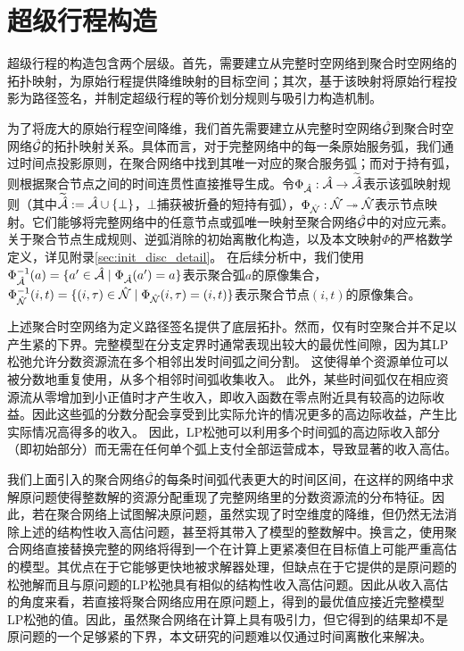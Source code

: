 \section{超级行程构造}
\label{sec:lbm}

超级行程的构造包含两个层级。首先，需要建立从完整时空网络到聚合时空网络的拓扑映射，为原始行程提供降维映射的目标空间；其次，基于该映射将原始行程投影为路径签名，并制定超级行程的等价划分规则与吸引力构造机制。


为了将庞大的原始行程空间降维，我们首先需要建立从完整时空网络$\full{\net}$到聚合时空网络$\hat{\mathcal{G}}$的拓扑映射关系。具体而言，对于完整网络中的每一条原始服务弧，我们通过时间点投影原则，在聚合网络中找到其唯一对应的聚合服务弧；而对于持有弧，则根据聚合节点之间的时间连贯性直接推导生成。令$\Phi_{\arcSet}:\full{\arcSet}\to \widetilde{\arcSet}$表示该弧映射规则（其中$\widetilde{\hat{\mathcal{A}}}:=\hat{\mathcal{A}}\cup\{\bot\}$，$\bot$捕获被折叠的短持有弧），$\Phi_{\nodeSet}:\full{\nodeSet}\twoheadrightarrow\nodeSet$表示节点映射。它们能够将完整网络中的任意节点或弧唯一映射至聚合网络$\hat{\mathcal{G}}$中的对应元素。关于聚合节点生成规则、逆弧消除的初始离散化构造，以及本文映射$\Phi$的严格数学定义，详见附录\ref{sec:init_disc_detail}。
在后续分析中，我们使用$\Phi_{\arcSet}^{-1}(a)=\{a'\in\full{\arcSet}\mid\Phi_{\arcSet}(a')=a\}$表示聚合弧$a$的原像集合，$\Phi_{\nodeSet}^{-1}(i,t)=\{(i,\tau)\in\full{\nodeSet}\mid\Phi_{\nodeSet}(i,\tau)=(i,t)\}$表示聚合节点$(i,t)$的原像集合。


上述聚合时空网络为定义路径签名提供了底层拓扑。然而，仅有时空聚合并不足以产生紧的下界。完整模型在分支定界时通常表现出较大的最优性间隙，因为其LP松弛允许分数资源流在多个相邻出发时间弧之间分割。
这使得单个资源单位可以被分数地重复使用，从多个相邻时间弧收集收入。
此外，某些时间弧仅在相应资源流从零增加到小正值时才产生收入，即收入函数在零点附近具有较高的边际收益。因此这些弧的分数分配会享受到比实际允许的情况更多的高边际收益，产生比实际情况高得多的收入。
因此，LP松弛可以利用多个时间弧的高边际收入部分（即初始部分）而无需在任何单个弧上支付全部运营成本，导致显著的收入高估。

我们上面引入的聚合网络$\hat{\mathcal{G}}$的每条时间弧代表更大的时间区间，在这样的网络中求解原问题使得整数解的资源分配重现了完整网络里的分数资源流的分布特征。因此，若在聚合网络上试图解决原问题，虽然实现了时空维度的降维，但仍然无法消除上述的结构性收入高估问题，甚至将其带入了模型的整数解中。换言之，使用聚合网络直接替换完整的网络将得到一个在计算上更紧凑但在目标值上可能严重高估的模型。其优点在于它能够更快地被求解器处理，但缺点在于它提供的是原问题的松弛解而且与原问题的LP松弛具有相似的结构性收入高估问题。因此从收入高估的角度来看，若直接将聚合网络应用在原问题上，得到的最优值应接近完整模型LP松弛的值。因此，虽然聚合网络在计算上具有吸引力，但它得到的结果却不是原问题的一个足够紧的下界，本文研究的问题难以仅通过时间离散化来解决。

